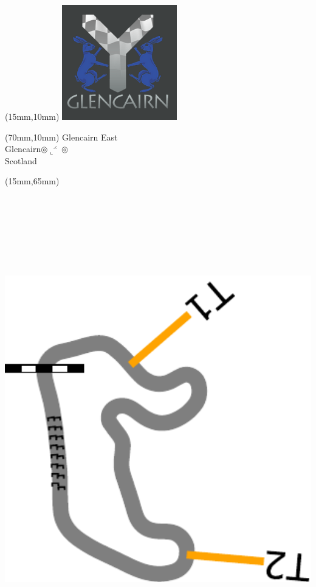 \null\newpage
\begin{textblock*}{50mm}(15mm,10mm)%
\includegraphics[width=50mm]{LG/GLCN.png}
\end{textblock*}
\begin{textblock*}{130mm}(70mm,10mm)%
{\fontsize{20}{20}\selectfont Glencairn East\\}
{\fontsize{16}{16}\selectfont Glencairn\hfill $\circledcirc\llcorner^{\rightthreetimes}\circledcirc$\\}
{\fontsize{12}{12}\selectfont Scotland\\}
\end{textblock*}
\begin{textblock*}{185mm}(15mm,65mm)%
\centering
\mbox{\includegraphics[width=185mm,height=210mm,keepaspectratio]{PT/GLCNE.pdf}}
\end{textblock*}
